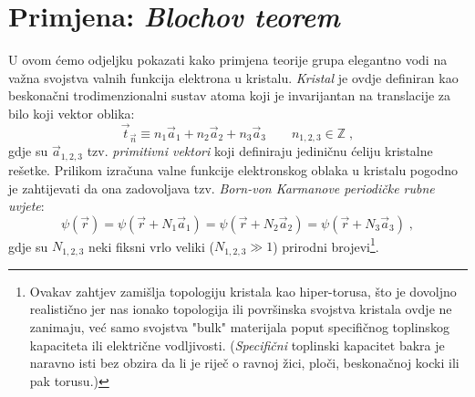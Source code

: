 \section{Primjena: \emph{Blochov teorem}}

U ovom ćemo odjeljku pokazati kako primjena teorije grupa elegantno
vodi na važna svojstva valnih funkcija elektrona u kristalu.
\emph{Kristal} je ovdje definiran kao beskonačni trodimenzionalni
sustav atoma koji je invarijantan na translacije 
za bilo koji vektor oblika:
\begin{equation}
  \vec{t}_{\vec{n}} \equiv n_1 \vec{a}_1 + n_2 \vec{a}_2 
  + n_3  \vec{a}_3 \qquad n_{1,2,3}\in\mathbb{Z}\;,
\label{tn}
\end{equation}
gdje su $\vec{a}_{1,2,3}$ tzv. \emph{primitivni vektori} koji definiraju
jediničnu ćeliju kristalne rešetke. Prilikom izračuna valne funkcije
elektronskog
oblaka u kristalu pogodno je zahtijevati da ona zadovoljava tzv.
\emph{Born-von Karmanove periodičke rubne uvjete}:
\begin{equation}
 \psi(\vec{r}) = \psi(\vec{r} + N_1 \vec{a}_1)= \psi(\vec{r} + N_2 \vec{a}_2)
= \psi(\vec{r} + N_3 \vec{a}_3) \;,
\end{equation}
gdje su $N_{1,2,3}$ neki fiksni vrlo veliki ($N_{1,2,3}\gg 1$) prirodni 
brojevi\footnote{
Ovakav zahtjev zamišlja topologiju kristala kao hiper-torusa, što je
dovoljno realistično jer nas ionako topologija ili površinska svojstva
kristala ovdje ne zanimaju, već samo svojstva "bulk" materijala poput
specifičnog toplinskog kapaciteta ili električne vodljivosti.
(\emph{Specifični} toplinski kapacitet bakra je naravno isti bez obzira da li je riječ
o ravnoj žici, ploči, beskonačnoj kocki ili pak torusu.)}.

